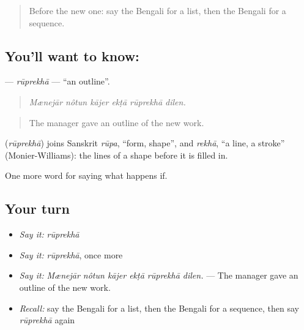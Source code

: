 \begin{quote}
Before the new one: say the Bengali for a list, then the Bengali for a sequence.
\end{quote}

\subsection*{You'll want to know: }
\textbf{} — \emph{rūprekhā} — \textquotedblleft{}an outline\textquotedblright{}.

\begin{quote}
     
\end{quote}

\begin{quote}
\emph{Mænejār nôtun kājer ekṭā rūprekhā dilen.}
\end{quote}

\begin{quote}
The manager gave an outline of the new work.
\end{quote}

\begin{cousinweb}
\textbf{} (\emph{rūprekhā}) joins Sanskrit \emph{rūpa}, \textquotedblleft{}form, shape\textquotedblright{}, and \emph{rekhā}, \textquotedblleft{}a line, a stroke\textquotedblright{} (Monier-Williams): the lines of a shape before it is filled in.
\end{cousinweb}

\begin{grammarlens}[title={What you've built}]
One more word for saying what happens if.
\end{grammarlens}

\subsection*{Your turn}
\begin{itemize}
\raggedright
  \item \emph{Say it:} \emph{rūprekhā}
  \item \emph{Say it:} \emph{rūprekhā}, once more
  \item \emph{Say it:} \emph{Mænejār nôtun kājer ekṭā rūprekhā dilen.} — The manager gave an outline of the new work.
  \item \emph{Recall:} say the Bengali for a list, then the Bengali for a sequence, then say \emph{rūprekhā} again
\end{itemize}

